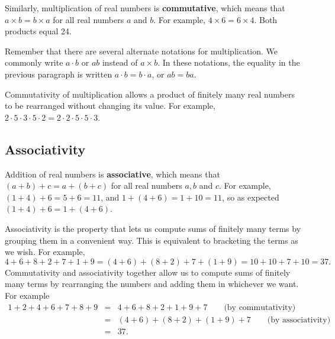 \documentclass[11pt]{book}               %
\begin{document}
Similarly, multiplication of real numbers is \textbf{commutative}, which means that $a \times b = b \times a$ for all real numbers $a$ and $b$.  For example, $4 \times 6 = 6 \times 4$.  Both products equal 24.

Remember that there are several alternate notations for multiplication.
We commonly write $a \cdot b$ or $ab$ instead of $a \times b$.
In these notations, the equality in the previous paragraph is written 
$a \cdot b = b \cdot a$,  or $ab=ba$.

Commutativity of multiplication allows a product of finitely many real numbers to be rearranged without changing its value.
For example, $2 \cdot 5 \cdot 3 \cdot 5 \cdot 2 = 2 \cdot 2  \cdot  5 \cdot 5 \cdot 3$.

% 


\subsection{Associativity}

Addition of real numbers is \textbf{associative}, which means that $(a+b)+c = a + (b+c)$ for all real numbers $a, b$ and $c$.
For example,  $(1+4) + 6 = 5+6 = 11$, and $1+(4+6) = 1+10 = 11$, so as expected $(1+4)+6 = 1 + (4+6)$.

Associativity is the property that lets us compute sums of finitely many terms by grouping them in a convenient way.
This is equivalent to bracketing the terms as we wish.
For example,
$$4 + 6 + 8 + 2 + 7 + 1 + 9 = (4 + 6) + (8 + 2)  + 7 + (1 + 9)  = 10 + 10  + 7 + 10 = 37.$$
Commutativity and associativity together allow us to compute sums of finitely many terms by rearranging the
numbers and adding them in whichever we want.  For example
\begin{eqnarray*}
1 + 2 + 4 + 6 + 7 + 8 + 9 &=& 4 + 6 + 8 + 2 + 1 + 9 + 7  \quad\quad \mbox{(by commutativity)}\\
& = & (4 + 6) + (8 + 2) + (1 + 9)  + 7  \quad\quad \mbox{(by associativity)}\\
& = & 37.
\end{eqnarray*}
\end{document}

